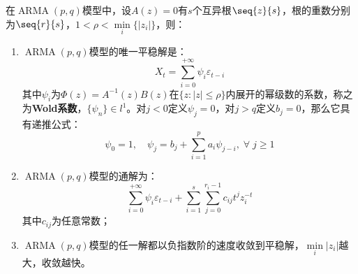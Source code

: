 \begin{theorem}\label{theo:ARMAPQSolution}
	在$\operatorname{ARMA}(p,q)$模型中，设$A(z)=0$有$s$个互异根$\seq{z}{s}$，根的重数分别为$\seq{r}{s}$，$1<\rho<\min\limits_i\{|z_i|\}$，则：
	\begin{enumerate}
		\item $\operatorname{ARMA}(p,q)$模型的唯一平稳解是：
		\begin{equation*}
			X_t=\sum_{i=0}^{+\infty}\psi_i\varepsilon_{t-i}
		\end{equation*}
		其中$\psi_i$为$\Phi(z)=A^{-1}(z)B(z)$在$\{z:|z|\leqslant\rho\}$内展开的幂级数的系数，称之为\textbf{Wold系数}，$\{\psi_n\}\in l^1$。对$j<0$定义$\psi_j=0$，对$j>q$定义$b_j=0$，那么它具有递推公式：
		\begin{equation*}
			\psi_0=1,\quad\psi_j=b_j+\sum_{i=1}^{p}a_i\psi_{j-i},\;\forall\;j\geqslant1
		\end{equation*}
		\item $\operatorname{ARMA}(p,q)$模型的通解为：
		\begin{equation*}
			\sum_{i=0}^{+\infty}\psi_i\varepsilon_{t-i}+\sum_{i=1}^{s}\sum_{j=0}^{r_i-1}c_{ij}t^{j}z_i^{-t}
		\end{equation*}
		其中$c_{ij}$为任意常数；
		\item $\operatorname{ARMA}(p,q)$模型的任一解都以负指数阶的速度收敛到平稳解，$\min\limits_i{|z_i|}$越大，收敛越快。
	\end{enumerate}
\end{theorem}
